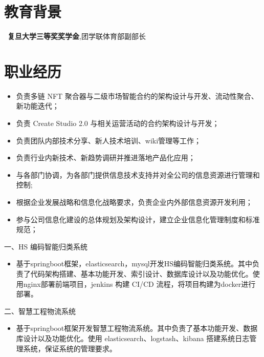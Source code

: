 \documentclass{resume}
\begin{document}



\section{教育背景}
\ \textbf{复旦大学三等奖奖学金},团学联体育部副部长

\section{职业经历}

\begin{itemize}[parsep=0.5ex]
  \item 负责多链 NFT 聚合器与二级市场智能合约的架构设计与开发、流动性聚合、新功能迭代；
  \item 负责 Create Studio 2.0 与相关运营活动的合约架构设计与开发；
  \item 负责团队内部技术分享、新人技术培训、wiki管理等工作；
  \item 负责行业内新技术、新趋势调研并推进落地产品化应用；
\end{itemize}

\begin{itemize}[parsep=0.5ex]
  \item 与各部门协调，为各部门提供信息技术支持并对全公司的信息资源进行管理和控制;
  \item 根据企业发展战略和信息化战略要求，负责企业内外部信息资源开发利用；
  \item 参与公司信息化建设的总体规划及架构设计，建立企业信息化管理制度和标准规范；
\end{itemize}

一、HS 编码智能归类系统
\begin{itemize}[parsep=0.5ex]
  \item 基于springboot框架，elasticsearch，mysql开发HS编码智能归类系统。其中负责了代码架构搭建、基本功能开发、索引设计、数据库设计以及功能优化。使用nginx部署前端项目，jenkins 构建 CI/CD 流程，将项目构建为docker进行部署。
\end{itemize}
二、智慧工程物流系统
\begin{itemize}[parsep=0.5ex]
  \item 基于springboot框架开发智慧工程物流系统。其中负责了基本功能开发、数据库设计以及功能优化。使用 elasticsearch、logstash、kibana 搭建系统日志管理系统，保证系统的管理要求。
\end{itemize}
\end{document}
